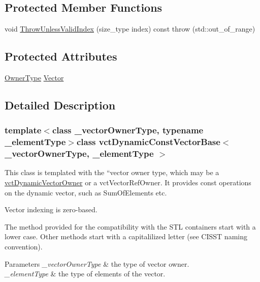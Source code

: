 \subsection*{Protected Member Functions}
\begin{DoxyCompactItemize}
\item 
void \hyperlink{classvct_dynamic_const_vector_base_ab8f95fc489f9d60c841100a21b010509}{Throw\+Unless\+Valid\+Index} (size\+\_\+type index) const   throw (std\+::out\+\_\+of\+\_\+range)
\end{DoxyCompactItemize}
\subsection*{Protected Attributes}
\begin{DoxyCompactItemize}
\item 
\hyperlink{classvct_dynamic_const_vector_base_a6d92548fcc7076cbd4c091ceb0faf364}{Owner\+Type} \hyperlink{classvct_dynamic_const_vector_base_a3cec7518a9b77eb391a9d19220e4b892}{Vector}
\end{DoxyCompactItemize}


\subsection{Detailed Description}
\subsubsection*{template$<$class \+\_\+vector\+Owner\+Type, typename \+\_\+element\+Type$>$class vct\+Dynamic\+Const\+Vector\+Base$<$ \+\_\+vector\+Owner\+Type, \+\_\+element\+Type $>$}

This class is templated with the ``vector owner type\textquotesingle{}\textquotesingle{}, which may be a \hyperlink{classvct_dynamic_vector_owner}{vct\+Dynamic\+Vector\+Owner} or a vct\+Vector\+Ref\+Owner. It provides const operations on the dynamic vector, such as Sum\+Of\+Elements etc.

Vector indexing is zero-\/based.

The method provided for the compatibility with the S\+T\+L containers start with a lower case. Other methods start with a capitalilized letter (see C\+I\+S\+S\+T naming convention).


\begin{DoxyParams}{Parameters}
{\em \+\_\+vector\+Owner\+Type} & the type of vector owner.\\
\hline
{\em \+\_\+element\+Type} & the type of elements of the vector. \\
\hline
\end{DoxyParams}


